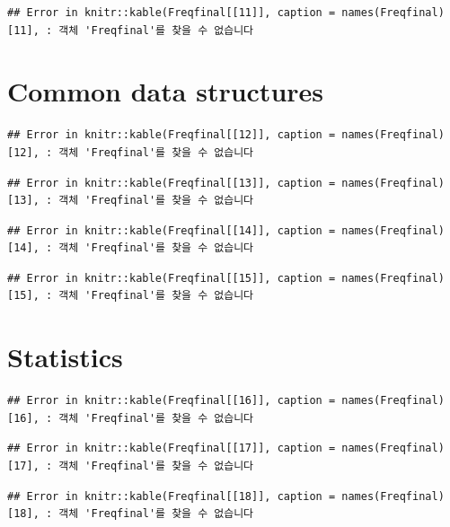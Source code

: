 \documentclass[10pt,]{krantz}
\begin{document}
\begin{verbatim}
## Error in knitr::kable(Freqfinal[[11]], caption = names(Freqfinal)[11], : 객체 'Freqfinal'를 찾을 수 없습니다
\end{verbatim}

\section{Common data structures}\label{common-data-structures}

\begin{verbatim}
## Error in knitr::kable(Freqfinal[[12]], caption = names(Freqfinal)[12], : 객체 'Freqfinal'를 찾을 수 없습니다
\end{verbatim}

\begin{verbatim}
## Error in knitr::kable(Freqfinal[[13]], caption = names(Freqfinal)[13], : 객체 'Freqfinal'를 찾을 수 없습니다
\end{verbatim}

\begin{verbatim}
## Error in knitr::kable(Freqfinal[[14]], caption = names(Freqfinal)[14], : 객체 'Freqfinal'를 찾을 수 없습니다
\end{verbatim}

\begin{verbatim}
## Error in knitr::kable(Freqfinal[[15]], caption = names(Freqfinal)[15], : 객체 'Freqfinal'를 찾을 수 없습니다
\end{verbatim}

\section{Statistics}\label{statistics}

\begin{verbatim}
## Error in knitr::kable(Freqfinal[[16]], caption = names(Freqfinal)[16], : 객체 'Freqfinal'를 찾을 수 없습니다
\end{verbatim}

\begin{verbatim}
## Error in knitr::kable(Freqfinal[[17]], caption = names(Freqfinal)[17], : 객체 'Freqfinal'를 찾을 수 없습니다
\end{verbatim}

\begin{verbatim}
## Error in knitr::kable(Freqfinal[[18]], caption = names(Freqfinal)[18], : 객체 'Freqfinal'를 찾을 수 없습니다
\end{verbatim}
\end{document}
